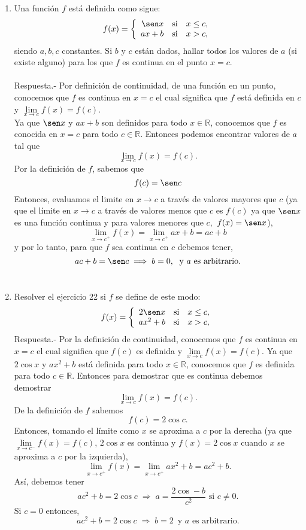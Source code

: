 \begin{enumerate}[\bfseries 1.]
    \item Una función $f$ está definida como sigue:
    $$f(x)=\left\{\begin{array}{rcl}
	\sen x & \mbox{si} & x\leq c,\\
	ax+b & \mbox{si} & x>c,\\
    \end{array}\right.$$
    siendo $a,b,c$ constantes. Si $b$ y $c$ están dados, hallar todos los valores de $a$ (si existe alguno) para los que $f$ es continua en el punto $x=c$.\\\\
	Respuesta.-\; Por definición de continuidad, de una función en un punto, conocemos que $f$ es continua en $x=c$ el cual significa que $f$ está definida en $c$ y $\lim\limits_{x\to c} f(x)=f(c)$.\\
	Ya que $\sen x$ y $ax+b$ son definidos para todo $x\in \mathbb{R}$, conocemos que $f$ es conocida en $x=c$ para todo $c\in \mathbb{R}$. Entonces podemos encontrar valores de $a$ tal que 
	$$\lim_{x\to c}f(x)=f(c).$$
	Por la definición de $f$, sabemos que
	$$f(c)=\sen c$$
	Entonces, evaluamos el limite en $x\to c$ a través de valores mayores que $c$ (ya que el límite en $x\to c$ a través de valores menos que $c$ es $f(c)$ ya que $\sen x$ es una función continua y para valores menores que $c,$ $f(x)=\sen x$),
	$$\lim_{x\to c^+}f(x)=\lim_{x\to c^+} ax+b=ac+b$$
	y por lo tanto, para que $f$ sea continua en $c$ debemos tener,
	$$ac+b=\sen c\; \Longrightarrow\; b=0,\; \mbox{ y } a \mbox{ es arbitrario}.$$\\

    \item Resolver el ejercicio 22 si $f$ se define de este modo:
    $$f(x)=\left\{\begin{array}{rcl}
	2\sen x & \mbox{si} & x\leq c,\\
	ax^2+b & \mbox{si} & x>c,\\
    \end{array}\right.$$
	Respuesta.-\; Por la definición de continuidad, conocemos que $f$ es continua en $x=c$ el cual significa que $f(c)$ es definida y $\lim\limits_{x\to c}f(x)=f(c)$. Ya que $2\cos x$ y $ax^2+b$ está definida para todo $x\in \mathbb{R}$, conocemos que $f$ es definida para todo $c\in \mathbb{R}$. Entonces para demostrar que es continua debemos demostrar
	$$\lim_{x\to c}f(x)=f(c).$$
	De la definición de $f$ sabemos 
	$$f(c)=2\cos c.$$
	Entonces, tomando el límite como $x$ se aproxima a $c$ por la derecha (ya que $\lim\limits_{x\to c^-} f(x)=f(c)$,  $2\cos x$ es continua y $f(x)=2\cos x$ cuando $x$ se aproxima a $c$ por la izquierda),
	$$\lim_{x\to c^+}f(x)=\lim_{x\to c^+} ax^2+b=ac^2+b.$$
	Así, debemos tener
	$$ac^2+b=2\cos c \; \Longrightarrow \; a=\dfrac{2\cos -b}{c^2} \mbox{ si } c\neq 0.$$
	Si $c=0$ entonces,
	$$ac^2+b=2\cos c \; \Longrightarrow \; b=2\, \mbox{ y } a \mbox{ es arbitrario}.$$\\


\end{enumerate}
